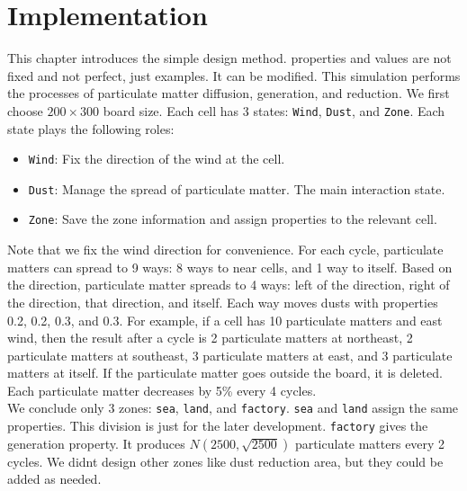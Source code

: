 \section{Implementation}
    This chapter introduces the simple design method. properties and values are not fixed and not perfect, just examples. It can be modified. This simulation performs the processes of particulate matter diffusion, generation, and reduction. We first choose $200\times300$ board size. Each cell has 3 states: \texttt{Wind}, \texttt{Dust}, and \texttt{Zone}. Each state plays the following roles:
    \begin{itemize}
        \item \texttt{Wind}: Fix the direction of the wind at the cell.
        \item \texttt{Dust}: Manage the spread of particulate matter. The main interaction state.
        \item \texttt{Zone}: Save the zone information and assign properties to the relevant cell.
    \end{itemize}
    Note that we fix the wind direction for convenience. For each cycle, particulate matters can spread to 9 ways: 8 ways to near cells, and 1 way to itself. Based on the direction, particulate matter spreads to 4 ways: left of the direction, right of the direction, that direction, and itself. Each way moves dusts with properties 0.2, 0.2, 0.3, and 0.3. For example, if a cell has 10 particulate matters and east wind, then the result after a cycle is 2 particulate matters at northeast, 2 particulate matters at southeast, 3 particulate matters at east, and 3 particulate matters at itself. If the particulate matter goes outside the board, it is deleted. Each particulate matter decreases by 5\% every 4 cycles.\\
    We conclude only 3 zones: \texttt{sea}, \texttt{land}, and \texttt{factory}. \texttt{sea} and \texttt{land} assign the same properties. This division is just for the later development. \texttt{factory} gives the generation property. It produces $N(2500, \sqrt{2500})$ particulate matters every 2 cycles. We didn\textquotesingle t design other zones like dust reduction area, but they could be added as needed.